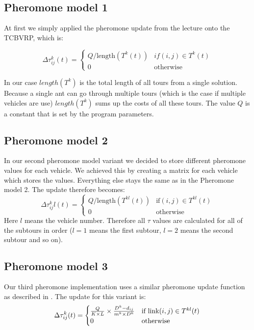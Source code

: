 \documentclass[a4paper]{scrartcl}
\begin{document}
\subsection{Pheromone model 1}
At first we simply applied the pheromone update from the lecture onto the TCBVRP, which is:

\begin{equation}
  \Delta \tau_{ij}^k(t) = \begin{cases}
    Q / \text{length}(T^k(t)) & if(i,j) \in T^k(t) \\
    0 & \text{otherwise}
  \end{cases} 
\end{equation}

In our case $length(T^k)$ is the total length of all tours from a single solution. Because a single ant can go through multiple tours (which is the case if multiple vehicles are use) $length(T^k)$ sums up the costs of all these tours.
The value $Q$ is a constant that is set by the program parameters.

\subsection{Pheromone model 2}

In our second pheromone model variant we decided to store different pheromone values for each vehicle. We achieved this by creating a matrix for each vehicle which stores the values. Everything else stays the same as in the Pheromone model 2.
The update therefore becomes:
\begin{equation}
  \Delta \tau_{ij}^kl(t) = \begin{cases}
    Q / \text{length}(T^{kl}(t)) & \text{if}(i,j) \in T^{kl}(t) \\
    0 & \text{otherwise}
  \end{cases} 
\end{equation}
Here $l$ means the vehicle number. Therefore all $\tau$ values are calculated for all of the subtours in order ($l=1$ means the first subtour, $l=2$ means the second subtour and so on).


\subsection{Pheromone model 3}

Our third pheromone implementation uses a similar pheromone update function as described in \cite{Yu2009171}.
The update for this variant is:
\begin{equation}
  \Delta \tau_{ij}^k(t) = \begin{cases}
    {Q \over {K \times L}} \times {{D^k - d_{ij}} \over {m^k \times D^k}} & \text{if link} (i,j)  \in T^{kl}(t) \\
    0 & \text{otherwise}
  \end{cases} 
\end{equation}
\end{document}
